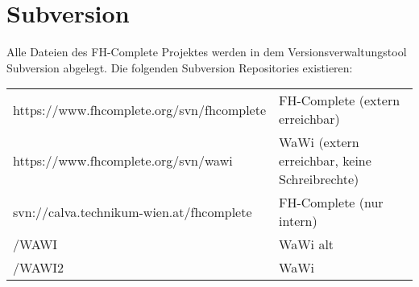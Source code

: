 \chapter{Subversion}
\label{Subversion}
Alle Dateien des FH-Complete Projektes werden in dem Versionsverwaltungstool Subversion abgelegt.
Die folgenden Subversion Repositories existieren:

\begin{tabular}{ll}
	https://www.fhcomplete.org/svn/fhcomplete & FH-Complete (extern erreichbar) \\
	https://www.fhcomplete.org/svn/wawi & WaWi (extern erreichbar, keine Schreibrechte) \\
	svn://calva.technikum-wien.at/fhcomplete & FH-Complete (nur intern) \\
\hspace*{22mm} /WAWI	 & WaWi alt \\
\hspace*{22mm} /WAWI2 & WaWi \\
\end{tabular}
